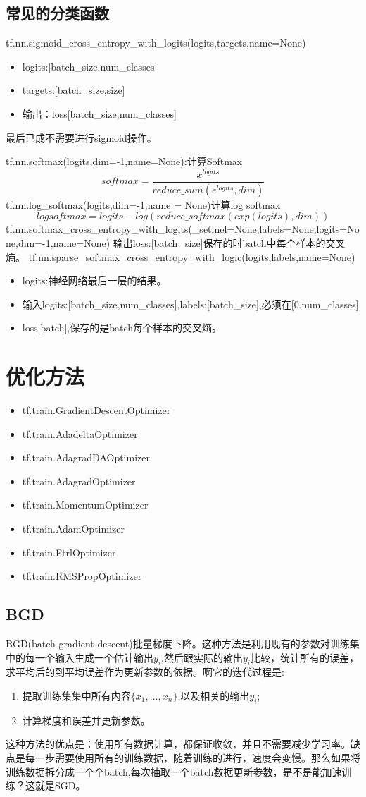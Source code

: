 \subsection{常见的分类函数}
tf.nn.sigmoid\_cross\_entropy\_with\_logits(logits,targets,name=None)
\begin{itemize}
	\item logits:[batch\_size,num\_classes]
	\item targets:[batch\_size,size]
	\item 输出：loss[batch\_size,num\_classes]
\end{itemize}
最后已成不需要进行sigmoid操作。\par
tf.nn.softmax(logits,dim=-1,name=None):计算Softmax
\[softmax = \frac{x^{logits}}{reduce\_sum(e^{logits},dim)}\]
tf.nn.log\_softmax(logits,dim=-1,name = None)计算log softmax
\[logsoftmax = logits-log(reduce\_softmax(exp(logits),dim))\]
tf.nn.softmax\_cross\_entropy\_with\_logits(\_setinel=None,labels=None,logits=None,dim=-1,name=None)
输出loss:[batch\_size]保存的时batch中每个样本的交叉熵。
tf.nn.sparse\_softmax\_cross\_entropy\_with\_logic(logits,labels,name=None)
\begin{itemize}
	\item logits:神经网络最后一层的结果。
	\item 输入logits:[batch\_size,num\_classes],labels:[batch\_size],必须在[0,num\_classes]
	\item loss[batch],保存的是batch每个样本的交叉熵。
\end{itemize}
\section{优化方法}
\begin{itemize}
	\item tf.train.GradientDescentOptimizer
	\item tf.train.AdadeltaOptimizer
	\item tf.train.AdagradDAOptimizer
	\item tf.train.AdagradOptimizer
	\item tf.train.MomentumOptimizer
	\item tf.train.AdamOptimizer
	\item tf.train.FtrlOptimizer
	\item tf.train.RMSPropOptimizer
\end{itemize}
\subsection{BGD}
BGD(batch gradient descent)批量梯度下降。这种方法是利用现有的参数对训练集中的每一个输入生成一个估计输出$y_i$,然后跟实际的输出$y_i$比较，统计所有的误差，求平均后的到平均误差作为更新参数的依据。啊它的迭代过程是:
\begin{enumerate}
	\item 提取训练集集中所有内容$\{x_1,\ldots,x_n\}$,以及相关的输出$y_i$;
	\item 计算梯度和误差并更新参数。
\end{enumerate}
这种方法的优点是：使用所有数据计算，都保证收敛，并且不需要减少学习率。缺点是每一步需要使用所有的训练数据，随着训练的进行，速度会变慢。那么如果将训练数据拆分成一个个batch,每次抽取一个batch数据更新参数，是不是能加速训练？这就是SGD。
